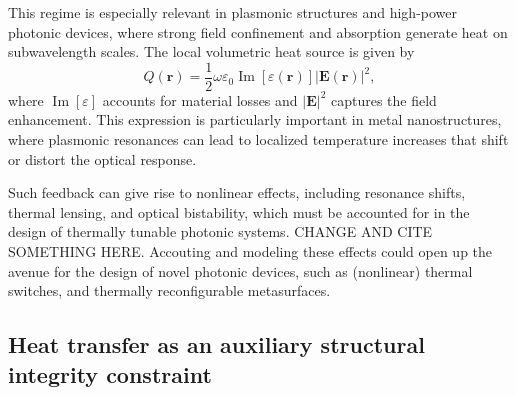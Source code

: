 This regime is especially relevant in plasmonic structures and high-power photonic devices, where strong field confinement and absorption generate heat on subwavelength scales. The local volumetric heat source is given by~\cite{plasm_heat_source}
\[
Q(\mathbf{r}) = \frac{1}{2} \omega \varepsilon_0 \operatorname{Im}[\varepsilon(\mathbf{r})] |\mathbf{E}(\mathbf{r})|^2,
\]
where $\operatorname{Im}[\varepsilon]$ accounts for material losses and $|\mathbf{E}|^2$ captures the field enhancement. This expression is particularly important in metal nanostructures, where plasmonic resonances can lead to localized temperature increases that shift or distort the optical response.

Such feedback can give rise to nonlinear effects, including resonance shifts, thermal lensing, and optical bistability, which must be accounted for in the design of thermally tunable photonic systems. CHANGE AND CITE SOMETHING HERE. Accouting and modeling
these effects could open up the avenue for the design of novel photonic devices, such as (nonlinear) thermal switches,  and thermally reconfigurable metasurfaces.


\subsection*{Heat transfer as an auxiliary structural integrity constraint}

